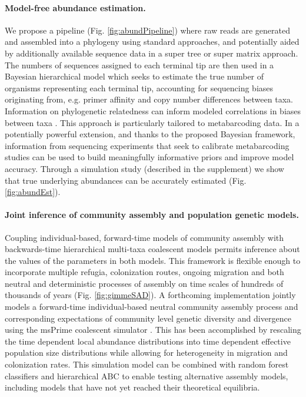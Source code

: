 \documentclass[12pt]{article}
\begin{document}
\paragraph{Model-free abundance estimation.} We propose a pipeline
(Fig. \ref{fig:abundPipeline}) where raw reads are generated and
assembled into a phylogeny using standard approaches, and potentially
aided by additionally available sequence data in a super tree or super
matrix approach. The numbers of sequences assigned to each terminal
tip are then used in a Bayesian hierarchical model which seeks to
estimate the true number of organisms representing each terminal tip,
accounting for sequencing biases originating from, e.g. primer
affinity and copy number differences between taxa.  Information on
phylogenetic relatedness can inform modeled correlations in biases
between taxa \citep[e.g. copy number is known to be phylogenetically
conserved at least in microbes]{angly2014}. This approach is
particularly tailored to metabarcoding data. In a potentially powerful
extension, and thanks to the proposed Bayesian framework, information
from sequencing experiments that seek to calibrate metabarcoding
studies \citep[e.g.,][]{krehenwinkel2016} can be used to
build meaningfully informative priors and improve model
accuracy. Through a simulation study (described in the supplement) we
show that true underlying abundances can be accurately estimated
(Fig. \ref{fig:abundEst}).

\paragraph{Joint inference of community assembly and population
  genetic models.} Coupling individual-based, forward-time models of
community assembly with backwards-time hierarchical multi-taxa
coalescent models permits inference about the values of the parameters
in both models. This framework is flexible enough to incorporate
multiple refugia, colonization routes, ongoing migration and both
neutral and deterministic processes of assembly on time scales of
hundreds of thousands of years (Fig. \ref{fig:gimmeSAD}). A
forthcoming implementation \citep[gimmeSAD$\pi$;][]{overcast} jointly
models a forward-time individual-based neutral community assembly
process \citep{rosindell2015} and corresponding expectations of
community level genetic diversity and divergence using the msPrime
coalescent simulator \citep{kelleher2016}. This has been accomplished
by rescaling the time dependent local abundance distributions into
time dependent effective population size distributions while allowing
for heterogeneity in migration and colonization rates. This simulation
model can be combined with random forest classifiers and hierarchical
ABC to enable testing alternative assembly models, including models
that have not yet reached their theoretical equilibria.
\end{document}
